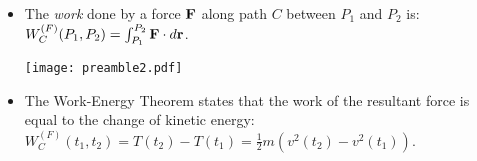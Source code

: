 \begin{itemize}
  \item The {\em work} done by a force ${\bf F}$ along path $C$ between $P_{1}$ and $P_{2}$ is:  $W_{C}^{(F)}(P_{1},P_{2})=\int_{P_{1}}^{P_{2}}{\bf F} \cdot {d {\bf r}}$.
    
          \begin{center}
        \texttt{[image: preamble2.pdf]}
        \end{center} 
  
  \item The Work-Energy Theorem states that the work of the resultant force is equal to the change of kinetic energy: $W_{C}^{(F)}(t_{1},t_{2})=T(t_{2})-T(t_{1})=\frac{1}{2}m \left ( v^{2}(t_{2})-v^{2}(t_{1}) \right )$.
\end{itemize}